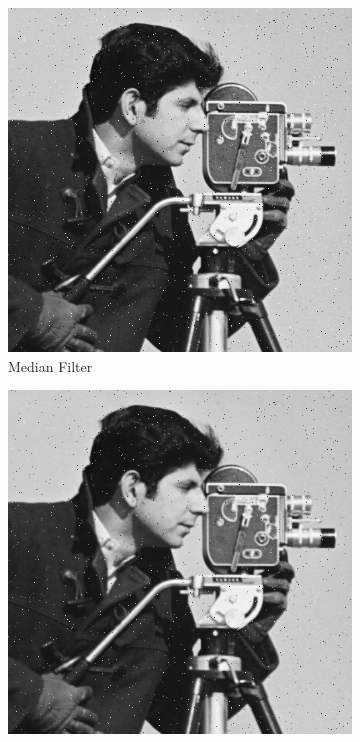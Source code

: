 \documentclass{article}\raggedbottom
\begin{document}
\begin{figure}[H]
	\centering
		\begin{subfigure}[b]{0.45\linewidth}
		\includegraphics[width=\linewidth]{../../2_Software/data/median_sp.png}
		\caption{Median Filter}
	\end{subfigure}
	\begin{subfigure}[b]{0.45\linewidth}
		\includegraphics[width=\linewidth]{../../2_Software/data/bilateral_sp.png}

\end{subfigure}
\end{figure}
\end{document}
